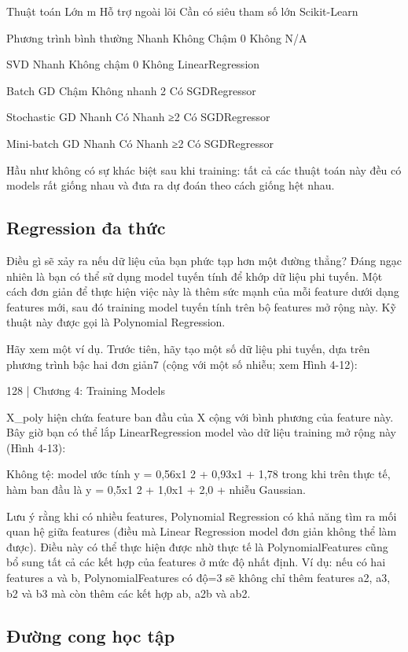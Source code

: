 Thuật toán Lớn m Hỗ trợ ngoài lõi Cần có siêu tham số lớn Scikit-Learn

Phương trình bình thường Nhanh Không Chậm 0 Không N/A

SVD Nhanh Không chậm 0 Không LinearRegression

Batch GD Chậm Không nhanh 2 Có SGDRegressor

Stochastic GD Nhanh Có Nhanh ≥2 Có SGDRegressor

Mini-batch GD Nhanh Có Nhanh ≥2 Có SGDRegressor

Hầu như không có sự khác biệt sau khi training: tất cả các thuật toán này đều có models rất giống nhau và đưa ra dự đoán theo cách giống hệt nhau.

\subsection{Regression đa thức}

Điều gì sẽ xảy ra nếu dữ liệu của bạn phức tạp hơn một đường thẳng? Đáng ngạc nhiên là bạn có thể sử dụng model tuyến tính để khớp dữ liệu phi tuyến. Một cách đơn giản để thực hiện việc này là thêm sức mạnh của mỗi feature dưới dạng features mới, sau đó training model tuyến tính trên bộ features mở rộng này. Kỹ thuật này được gọi là Polynomial Regression.

Hãy xem một ví dụ. Trước tiên, hãy tạo một số dữ liệu phi tuyến, dựa trên phương trình bậc hai đơn giản7 (cộng với một số nhiễu; xem Hình 4-12):

128 | Chương 4: Training Models

X\_poly hiện chứa feature ban đầu của X cộng với bình phương của feature này. Bây giờ bạn có thể lắp LinearRegression model vào dữ liệu training mở rộng này (Hình 4-13):

Không tệ: model ước tính y = 0,56x1 2 + 0,93x1 + 1,78 trong khi trên thực tế, hàm ban đầu là y = 0,5x1 2 + 1,0x1 + 2,0 + nhiễu Gaussian.

Lưu ý rằng khi có nhiều features, Polynomial Regression có khả năng tìm ra mối quan hệ giữa features (điều mà Linear Regression model đơn giản không thể làm được). Điều này có thể thực hiện được nhờ thực tế là PolynomialFeatures cũng bổ sung tất cả các kết hợp của features ở mức độ nhất định. Ví dụ: nếu có hai features a và b, PolynomialFeatures có độ=3 sẽ không chỉ thêm features a2, a3, b2 và b3 mà còn thêm các kết hợp ab, a2b và ab2.

\subsection{Đường cong học tập}

